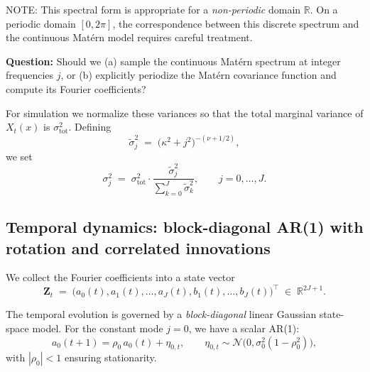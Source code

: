 \documentclass[answers,12pt,addpoints]{exam}
\begin{document}
{\color{blue}
NOTE: This spectral form is appropriate for a \emph{non-periodic} domain $\mathbb{R}$. On a periodic domain $[0,2\pi]$, the correspondence between this discrete spectrum and the continuous Matérn model requires careful treatment. 

\textbf{Question:} Should we (a) sample the continuous Matérn spectrum at integer frequencies $j$, or (b) explicitly periodize the Matérn covariance function and compute its Fourier coefficients?
}

For simulation we normalize these variances so that the total marginal variance of $X_t(x)$ is $\sigma^2_{\text{tot}}$. Defining
\[
  \tilde{\sigma}_j^2
  \;=\;
  \bigl(\kappa^2 + j^2\bigr)^{-(\nu + 1/2)},
\]
we set
\begin{equation}
  \sigma_j^2
  \;=\;
  \sigma^2_{\text{tot}}
  \cdot
  \frac{\tilde{\sigma}_j^2}{\sum_{k=0}^{J} \tilde{\sigma}_k^2},
  \qquad j = 0,\dots,J.
  \label{eq:sigma-normalization}
\end{equation}

\subsection{Temporal dynamics: block-diagonal AR(1) with rotation and correlated innovations}

We collect the Fourier coefficients into a state vector
\begin{equation}
  \mathbf{Z}_t
  \;=\;
  \bigl(a_0(t), a_1(t),\dots,a_J(t), b_1(t),\dots,b_J(t)\bigr)^\top
  \;\in\; \mathbb{R}^{2J+1}.
  \label{eq:state-vector}
\end{equation}

The temporal evolution is governed by a \emph{block-diagonal} linear Gaussian state-space model. For the constant mode $j=0$, we have a scalar AR(1):
\begin{equation}
  a_0(t+1) = \rho_0\, a_0(t) + \eta_{0,t},
  \qquad \eta_{0,t} \sim \mathcal{N}\bigl(0, \sigma_0^2(1 - \rho_0^2)\bigr),
  \label{eq:ar1-j0}
\end{equation}
with $|\rho_0| < 1$ ensuring stationarity.
\end{document}
